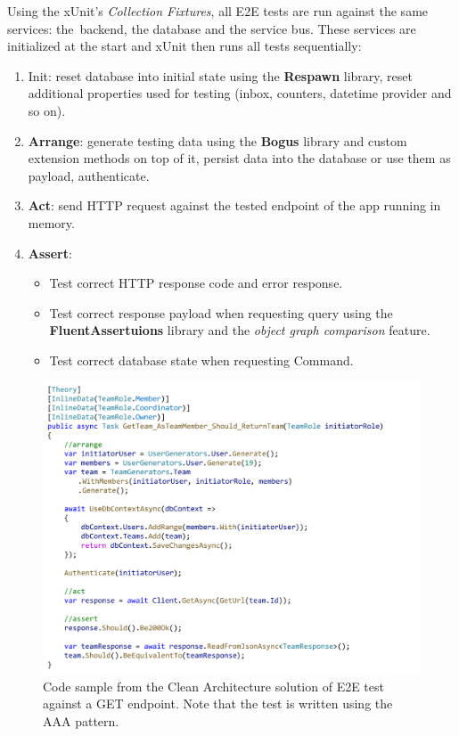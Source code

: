 Using the xUnit's \textit{Collection Fixtures}, all E2E tests are run against the same services: the~backend, the database and the service bus. These services are initialized at the start and xUnit then runs all tests sequentially:
\begin{enumerate}[start=0]
    \item Init: reset database into initial state using the \textbf{Respawn} library, reset additional properties used for testing (inbox, counters, datetime provider and so on).
    
    \item \textbf{Arrange}: generate testing data using the \textbf{Bogus} library and custom extension methods on top of it, persist data into the database or use them as payload, authenticate.
    
    \item \textbf{Act}: send HTTP request against the tested endpoint of the app running in memory.
    
    \item \textbf{Assert}:
    \begin{itemize}
        \item Test correct HTTP response code and error response.
        \item Test correct response payload when requesting query using the \textbf{FluentAssertuions} library and the \textit{object graph comparison} feature.
        \item Test correct database state when requesting Command.
    \end{itemize}
\end{enumerate}

\begin{figure} [H]
    \centering
    \includegraphics[width=\textwidth]{figures/endpoint-test.pdf}
    \caption{Code sample from the Clean Architecture solution of E2E test against a GET endpoint. Note that the test is written using the AAA pattern.}
    \label{fig:endpoint_test}
\end{figure}

